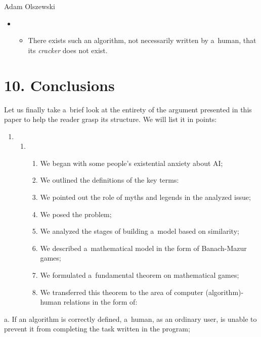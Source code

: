 \begin{artengenv}{Adam Olszewski}
\begin{itemize}
\item \begin{itemize}
\item There exists such an algorithm, not necessarily written by a~human, that its \textit{cracker} does not exist.
\end{itemize}
\end{itemize}
\section{10. Conclusions}
Let us finally take a~brief look at the entirety of the argument presented in this paper to help the reader grasp its structure. We will list it in points:

\begin{enumerate}
\item \begin{enumerate}
\item \begin{enumerate}
\item We began with some people's existential anxiety about AI;
\item We outlined the definitions of the key terms:
\item We pointed out the role of myths and legends in the analyzed issue;
\item We posed the problem;
\item We analyzed the stages of building a~model based on similarity;
\item We described a~mathematical model in the form of Banach-Mazur games;
\item We formulated a~fundamental theorem on mathematical games;
\item We transferred this theorem to the area of computer (algorithm)-human relations in the form of:
\end{enumerate}
\end{enumerate}
\end{enumerate}
a. If an algorithm is correctly defined, a~human, as an ordinary user, is unable to prevent it from completing the task written in the program;


\end{artengenv}
